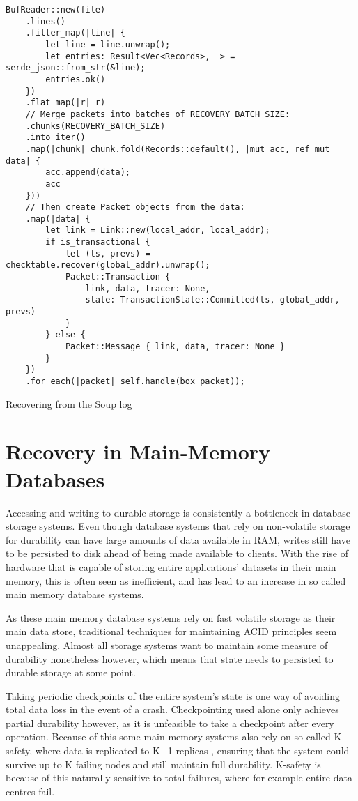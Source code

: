 \documentclass[b5paper]{report}
\begin{document}
\begin{listing}
  \begin{verbatim}
BufReader::new(file)
    .lines()
    .filter_map(|line| {
        let line = line.unwrap();
        let entries: Result<Vec<Records>, _> = serde_json::from_str(&line);
        entries.ok()
    })
    .flat_map(|r| r)
    // Merge packets into batches of RECOVERY_BATCH_SIZE:
    .chunks(RECOVERY_BATCH_SIZE)
    .into_iter()
    .map(|chunk| chunk.fold(Records::default(), |mut acc, ref mut data| {
        acc.append(data);
        acc
    }))
    // Then create Packet objects from the data:
    .map(|data| {
        let link = Link::new(local_addr, local_addr);
        if is_transactional {
            let (ts, prevs) = checktable.recover(global_addr).unwrap();
            Packet::Transaction {
                link, data, tracer: None,
                state: TransactionState::Committed(ts, global_addr, prevs)
            }
        } else {
            Packet::Message { link, data, tracer: None }
        }
    })
    .for_each(|packet| self.handle(box packet));
  \end{verbatim}
  \caption{Recovering from the Soup log}
\end{listing}

\section{Recovery in Main-Memory Databases}
Accessing and writing to durable storage is consistently a bottleneck in
database storage systems. Even though database systems that rely on non-volatile
storage for durability can have large amounts of data available in RAM, writes
still have to be persisted to disk ahead of being made available to clients.
With the rise of hardware that is capable of storing entire applications'
datasets in their main memory, this is often seen as inefficient, and has lead
to an increase in so called main memory database systems.

As these main memory database systems rely on fast volatile storage as their
main data store, traditional techniques for maintaining ACID principles seem
unappealing. Almost all storage systems want to maintain some measure of
durability nonetheless however, which means that state needs to persisted to
durable storage at some point.

Taking periodic checkpoints of the entire system's state is one way of avoiding
total data loss in the event of a crash. Checkpointing used alone only achieves
partial durability however, as it is unfeasible to take a checkpoint after every
operation. Because of this some main memory systems also rely on so-called
K-safety, where data is replicated to K+1 replicas \cite{memory-checkpoint},
ensuring that the system could survive up to K failing nodes and still maintain
full durability. K-safety is because of this naturally sensitive to total
failures, where for example entire data centres fail.
\end{document}
